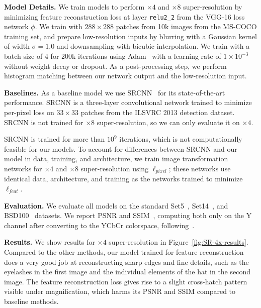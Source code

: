\documentclass[runningheads]{llncs}
\begin{document}
\vspace{1mm}
\noindent \textbf{Model Details.}
We train models to perform $\times4$ and $\times8$ super-resolution by minimizing feature
reconstruction loss at layer \verb.relu2_2. from the VGG-16 loss network $\phi$. We train with
$288\times288$ patches from 10k images from the MS-COCO training set, and prepare low-resolution
inputs by blurring with a Gaussian kernel of width $\sigma=1.0$ and downsampling with bicubic
interpolation. We train with a batch size of 4 for 200k iterations using Adam~\cite{kingma2014adam}
with a learning rate of $1\times10^{-3}$ without weight decay or dropout. As a post-processing step,
we perform histogram matching between our network output and the low-resolution input.

\vspace{1mm}
\noindent \textbf{Baselines.}
As a baseline model we use SRCNN~\cite{dong2015image} for its state-of-the-art performance. SRCNN
is a three-layer convolutional network trained to minimize per-pixel loss on $33\times33$
patches from the ILSVRC 2013 detection dataset. SRCNN is not trained for $\times8$ super-resolution,
so we can only evaluate it on $\times4$.

SRCNN is trained for more than $10^9$ iterations, which is not computationally feasible for our
models. To account for differences between SRCNN and our model in data, training, and architecture,
we train image transformation networks for $\times4$ and $\times8$ super-resolution using
$\ell_{pixel}$; these networks use identical data, architecture, and training as the networks trained
to minimize $\ell_{feat}$.






\vspace{1mm}
\noindent \textbf{Evaluation.}
We evaluate all models on the standard Set5~\cite{bevilacqua2012low},
Set14~\cite{zeyde2010single}, and BSD100~\cite{huang2015single} datasets. We report PSNR and
SSIM~\cite{wang2004image}, computing both only on the Y channel after converting to the YCbCr
colorspace, following~\cite{dong2015image,timofte2014adjusted}.




\vspace{1mm}
\noindent \textbf{Results.}
We show results for $\times4$ super-resolution in Figure~\ref{fig:SR-4x-results}.
Compared to the other methods, our model trained for feature reconstruction does a very good job
at reconstructing sharp edges and fine details, such as the eyelashes in the first image and the
individual elements of the hat in the second image. The feature reconstruction loss gives rise to
a slight cross-hatch pattern visible under magnification, which harms its PSNR and SSIM compared
to baseline methods.
\end{document}
